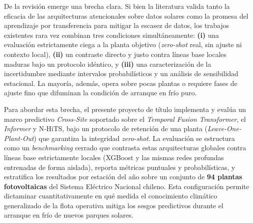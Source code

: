 De la revisión emerge una brecha clara. Si bien la literatura valida tanto la eficacia de las arquitecturas atencionales sobre datos solares como la promesa del aprendizaje por transferencia para mitigar la escasez de datos, los trabajos existentes rara vez combinan tres condiciones simultáneamente: \textbf{(i)} una evaluación estrictamente ciega a la planta objetivo (\textit{zero-shot} real, sin ajuste ni contexto local), \textbf{(ii)} un contraste directo y justo contra líneas base locales maduras bajo un protocolo idéntico, y \textbf{(iii)} una caracterización de la incertidumbre mediante intervalos probabilísticos y un análisis de sensibilidad estacional. La mayoría, además, opera sobre pocas plantas o requiere fases de ajuste fino que difuminan la condición de arranque en frío puro.

Para abordar esta brecha, el presente proyecto de título implementa y evalúa un marco predictivo \textit{Cross-Site} soportado sobre el \textit{Temporal Fusion Transformer}, el \textit{Informer} y N-HiTS, bajo un protocolo de retención de una planta (\textit{Leave-One-Plant-Out}) que garantiza la integridad \textit{zero-shot}. La evaluación se estructura como un \textit{benchmarking} cerrado que contrasta estas arquitecturas globales contra líneas base estrictamente locales (XGBoost y las mismas redes profundas entrenadas de forma aislada), reporta métricas puntuales y probabilísticas, y estratifica los resultados por estación del año sobre un conjunto de \textbf{94 plantas fotovoltaicas} del Sistema Eléctrico Nacional chileno. Esta configuración permite dictaminar cuantitativamente en qué medida el conocimiento climático generalizado de la flota operativa mitiga los sesgos predictivos durante el arranque en frío de nuevos parques solares.
